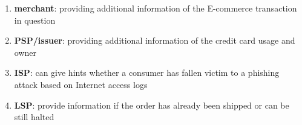 \begin{enumerate}
    \item \textbf{merchant}: providing additional information of the E-commerce transaction in question
    \item \textbf{\gls{PSP}/issuer}: providing additional information of the credit card usage and owner
    \item \textbf{\gls{ISP}}: can give hints whether a consumer has fallen victim to a phishing attack based on Internet access logs
    \item \textbf{\gls{LSP}}: provide information if the order has already been shipped or can be still halted
\end{enumerate}

